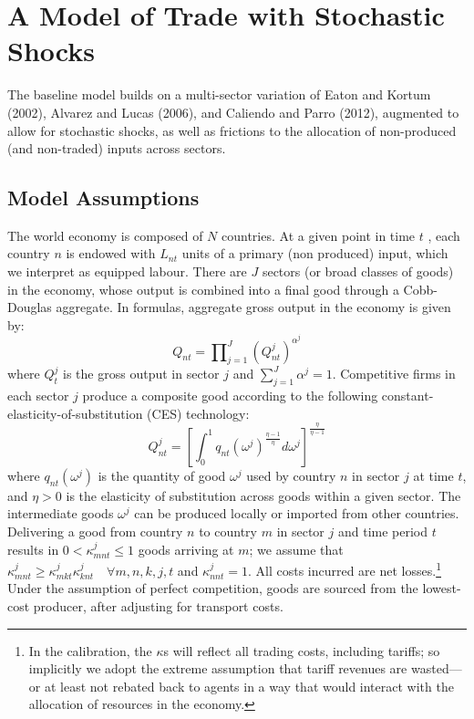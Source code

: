 \documentclass[12pt]{article}
\begin{document}
\section{A Model of Trade with Stochastic Shocks}

The baseline model builds on a multi-sector variation of Eaton and Kortum
(2002), Alvarez and Lucas (2006), and Caliendo and Parro (2012), augmented
to allow for stochastic shocks, as well as frictions to the allocation of
non-produced (and non-traded) inputs across sectors.

\subsection{Model Assumptions}

The world economy is composed of $N$ countries. At a given point in time $t$%
, each country $n$ is endowed with $L_{nt}$ units of a primary (non
produced) input, which we interpret as equipped labour. There are $J$
sectors (or broad classes of goods) in the economy, whose output is combined
into a final good through a Cobb-Douglas aggregate. In formulas, aggregate
gross output in the economy is given by: 
\begin{equation}
Q_{nt}=\prod\nolimits_{j=1}^{J}\left( Q_{nt}^{j}\right) ^{\alpha ^{j}}
\label{aggregate}
\end{equation}%
where $Q_{t}^{j}$ is the gross output in sector $j$ and $\sum_{j=1}^{J}%
\alpha ^{j}=1$. Competitive firms in each sector $j$ produce a composite
good according to the following constant-elasticity-of-substitution (CES)
technology: 
\begin{equation}
Q_{nt}^{j}=\left[ \int_{0}^{1}q_{nt}(\omega ^{j})^{\frac{\eta -1}{\eta }%
}d\omega ^{j}\right] ^{\frac{\eta }{\eta -1}}  \label{sectoroutput}
\end{equation}%
where $q_{nt}(\omega ^{j})$ is the quantity of good $\omega ^{j}$ used by
country $n$ in sector $j$ at time $t$, and $\eta >0$ is the elasticity of
substitution across goods within a given sector. The intermediate goods $%
\omega ^{j}$ can be produced locally or imported from other countries.
Delivering a good from country $n$ to country $m$ in sector $j$ and time
period $t$ results in $0<\kappa _{mnt}^{j}\leq 1$ goods arriving at $m$; we
assume that $\kappa _{mnt}^{j}\geq \kappa _{mkt}^{j}\kappa _{knt}^{j}\quad
\forall m,n,k,j,t$ and $\kappa _{nnt}^{j}=1$. All costs incurred are net
losses.\footnote{%
In the calibration, the $\kappa $s will reflect all trading costs, including
tariffs; so implicitly we adopt the extreme assumption that tariff revenues
are wasted---or at least not rebated back to agents in a way that would
interact with the allocation of resources in the economy.} Under the
assumption of perfect competition, goods are sourced from the lowest-cost
producer, after adjusting for transport costs.
\end{document}
